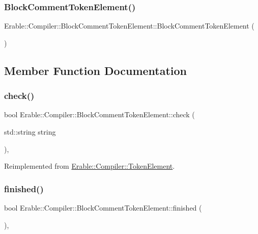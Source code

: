 \subsubsection{\texorpdfstring{BlockCommentTokenElement()}{BlockCommentTokenElement()}}
{\footnotesize\ttfamily Erable\+::\+Compiler\+::\+Block\+Comment\+Token\+Element\+::\+Block\+Comment\+Token\+Element (\begin{DoxyParamCaption}{ }\end{DoxyParamCaption})}



\subsection{Member Function Documentation}
\mbox{\label{class_erable_1_1_compiler_1_1_block_comment_token_element_ac659ec24cb21bae5b4985f8d9c23d2cb}} 
\subsubsection{\texorpdfstring{check()}{check()}}
{\footnotesize\ttfamily bool Erable\+::\+Compiler\+::\+Block\+Comment\+Token\+Element\+::check (\begin{DoxyParamCaption}\item[{std\+::string}]{string }\end{DoxyParamCaption})\hspace{0.3cm}{\ttfamily [override]}, {\ttfamily [virtual]}}



Reimplemented from \mbox{\hyperlink{class_erable_1_1_compiler_1_1_token_element_a939f70ed141904d769b6d9f6ecf39cb1}{Erable\+::\+Compiler\+::\+Token\+Element}}.

\mbox{\label{class_erable_1_1_compiler_1_1_block_comment_token_element_ad212efa213376be9172cf48674041c6f}} 
\subsubsection{\texorpdfstring{finished()}{finished()}}
{\footnotesize\ttfamily bool Erable\+::\+Compiler\+::\+Block\+Comment\+Token\+Element\+::finished (\begin{DoxyParamCaption}{ }\end{DoxyParamCaption})\hspace{0.3cm}{\ttfamily [override]}, {\ttfamily [virtual]}}



